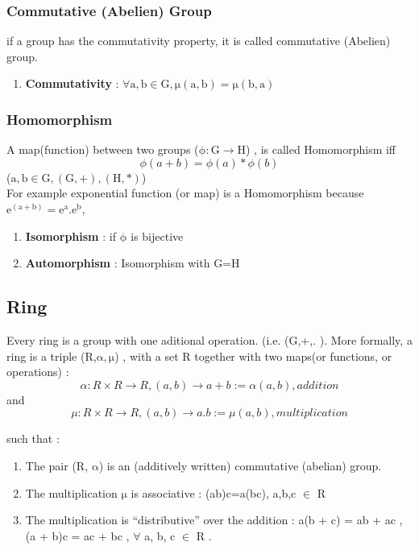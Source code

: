 \documentclass[11pt]{article}
\begin{document}
\subsubsection{Commutative (Abelien) Group}
if a group has the commutativity property, it is called commutative (Abelien) group.

\begin{enumerate}
\item \textbf{Commutativity} : $\mathrm{\forall a,b \in G, \mu(a,b)=\mu(b,a)}$
\end{enumerate}

\subsubsection{Homomorphism}
A map(function) between two groups ($\mathrm{\phi : G \rightarrow H }$) , is called Homomorphism iff
\begin{equation}
 \phi(a+b)=\phi(a)*\phi(b)
\end{equation}
($\mathrm{a, b \in G, (G,+) , (H,*)}$)\\
For example exponential function (or map) is a Homomorphism because $\mathrm{e^{(a+b)}=e^a.e^b}$,
\begin{enumerate}
\item \textbf{Isomorphism}  : if $\mathrm{\phi}$ is bijective
\item \textbf{Automorphism} : Isomorphism with G=H
\end{enumerate}


\subsection{Ring}
Every ring is a group with one aditional operation. (i.e. (G,+,. ). More formally, a ring is a triple (R,$\mathrm{\alpha,\mu}$) , with a set R together with two maps(or functions, or operations) :
\begin{equation}
 \alpha : R \times R \rightarrow R, (a,b) \rightarrow a+b:=\alpha(a,b), addition
\end{equation}
 and
\begin{equation}
 \mu : R \times R \rightarrow R, (a,b) \rightarrow a.b:=\mu(a,b), multiplication
\end{equation}

such that :
\begin{enumerate}
\item The pair (R, $\mathrm{\alpha}$) is an (additively written) commutative (abelian) group.
\item The multiplication $\mathrm{\mu}$ is associative :  (ab)c=a(bc), a,b,c $\mathrm{\in}$ R
\item The multiplication is “distributive” over the addition : a(b + c) = ab + ac , (a + b)c = ac + bc , $\mathrm{\forall}$ a, b, c   $\mathrm{\in}$ R .
\end{enumerate}
\end{document}
